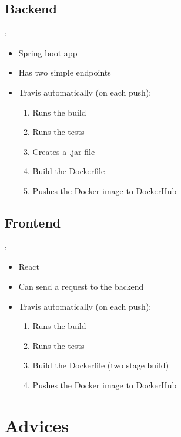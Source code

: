 \documentclass{beamer}
\begin{document}
\subsection{Backend}
\begin{frame}{\secname : \subsecname}

\begin{itemize}
    \item Spring boot app
    \item Has two simple endpoints
    \item Travis automatically (on each push):
    \begin{enumerate}
        \item Runs the build
        \item Runs the tests
        \item Creates a .jar file
        \item Build the Dockerfile
        \item Pushes the Docker image to DockerHub
    \end{enumerate}
\end{itemize}

\end{frame}

\subsection{Frontend}
\begin{frame}{\secname : \subsecname}

\begin{itemize}
    \item React
    \item Can send a request to the backend
    \item Travis automatically (on each push):
    \begin{enumerate}
        \item Runs the build
        \item Runs the tests
        \item Build the Dockerfile (two stage build)
        \item Pushes the Docker image to DockerHub
    \end{enumerate}
\end{itemize}

\end{frame}

\section{Advices}
\end{document}
